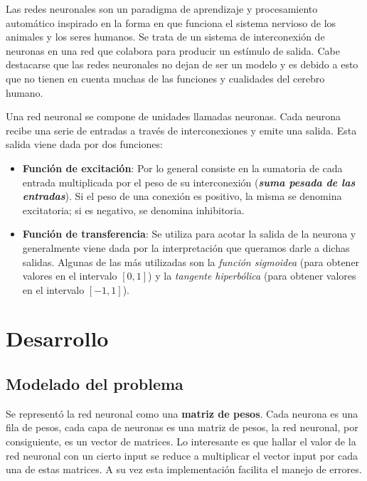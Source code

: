 \documentclass[%
    final,
    reprint,
    notitlepage,
    narroweqnarray,
    inline,
    twoside,
    invited
    ]{ieee}
\begin{document}
\PARstart Las redes neuronales son un paradigma de aprendizaje y procesamiento automático inspirado en la forma en que funciona el sistema nervioso de los animales y los seres humanos. Se trata de un sistema de interconexión de neuronas en una red que colabora para producir un estímulo de salida. Cabe destacarse que las redes neuronales no dejan de ser un modelo y es debido a esto que no tienen en cuenta muchas de las funciones y cualidades del cerebro humano.
\par Una red neuronal se compone de unidades llamadas neuronas. Cada neurona recibe una serie de entradas a través de interconexiones y emite una salida. Esta salida viene dada por dos funciones:
\begin{itemize}
\item \textbf{Función de excitación}: Por lo general consiste en la sumatoria de cada entrada multiplicada por el peso de su interconexión (\textit{\textbf{suma pesada de las entradas}}). Si el peso de una conexión es positivo, la misma se denomina excitatoria; si es negativo, se denomina inhibitoria.
\item \textbf{Función de transferencia}:  Se utiliza para acotar la salida de la neurona y generalmente viene dada por la interpretación que queramos darle a dichas salidas. Algunas de las más utilizadas son la \textit{función sigmoidea} (para obtener valores en el intervalo $[0,1]$) y la \textit{tangente hiperbólica} (para obtener valores en el intervalo $[-1,1]$).
\end{itemize}


\section{Desarrollo}

\subsection{Modelado del problema}

\par Se representó la red neuronal como una \textbf{matriz de pesos}. Cada neurona es una fila de pesos, cada capa de neuronas es una matriz de pesos, la red neuronal, por consiguiente, es un vector de matrices. Lo interesante es que hallar el valor de la red neuronal con un cierto input se reduce a multiplicar el vector input por cada una de estas matrices. A su vez esta implementación facilita el manejo de errores.\\
\end{document}
